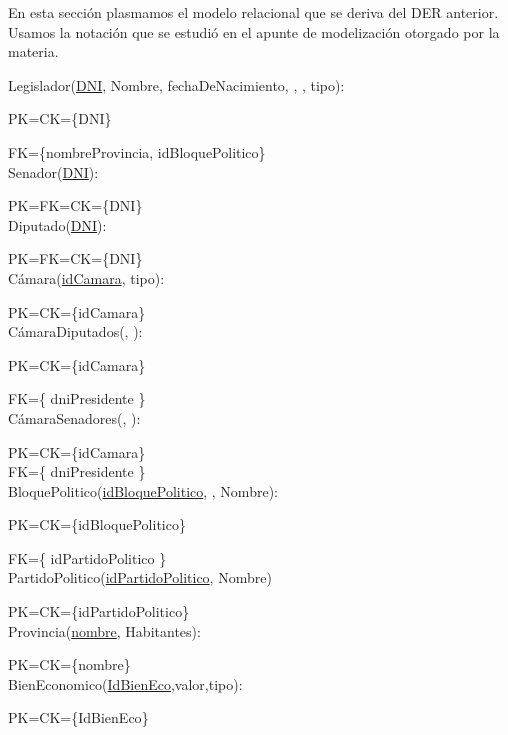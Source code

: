 En esta secci\'on plasmamos el modelo relacional que se deriva del DER anterior. Usamos la notaci\'on que se estudi\'o en el apunte de modelizaci\'on otorgado por la materia.

Legislador(\underline{DNI}, Nombre, fechaDeNacimiento, , , tipo):

PK=CK={\{DNI}\}

FK={\{nombreProvincia, idBloquePolitico}\} \\

Senador(\underline{DNI}):

PK=FK=CK={\{DNI}\}\\

Diputado(\underline{DNI}):

PK=FK=CK={\{DNI}\}\\

C\'amara(\underline{idCamara}, tipo):

PK=CK={\{idCamara}\} \\

C\'amaraDiputados(\underline{}, ):

PK=CK={\{idCamara}\} 

FK={\{ dniPresidente }\} \\

C\'amaraSenadores(\underline{}, ):

PK=CK={\{idCamara}\} \\

FK={\{ dniPresidente }\} \\

BloquePolitico(\underline{idBloquePolitico}, , Nombre):

PK=CK={\{idBloquePolitico}\}

FK={\{ idPartidoPolitico }\} \\

PartidoPolitico(\underline{idPartidoPolitico}, Nombre)

PK=CK={\{idPartidoPolitico}\}\\

Provincia(\underline{nombre}, Habitantes):

PK=CK={\{nombre}\}\\

BienEconomico(\underline{IdBienEco},valor,tipo):

PK=CK={\{IdBienEco}\}\\

